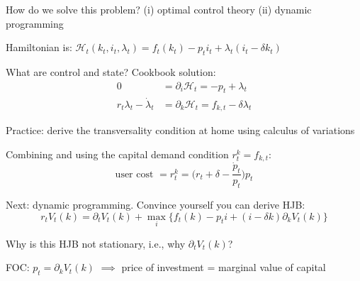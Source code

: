 \documentclass[11pt, aspectratio=169]{beamer}
\newenvironment{witemize}{\itemize\addtolength{\itemsep}{10pt}}{\enditemize}
\begin{document}
\begin{frame}{}
\begin{witemize}
\item How do we solve this problem? (i) optimal control theory (ii) dynamic programming 

\item Hamiltonian is: $\mathcal H_t (k_t, i_t, \lambda_t) = f_t(k_t) - p_t i_t + \lambda_t(i_t - \delta k_t)$ 

\item What are control and state? Cookbook solution:
	\begin{align*}
		0 &= \partial_i \mathcal H_t = - p_t + \lambda_t \\
		r_t \lambda_t - \dot \lambda_t &= \partial_k \mathcal H_t = f_{k, t} - \delta \lambda_t 
	\end{align*}

\item Practice: derive the transversality condition at home using calculus of variations

\item Combining and using the capital demand condition $r_t^k = f_{k, t}$:
\begin{equation*}
	\text{user cost } = r_t^k = \bigg( r_t + \delta - \frac{\dot p_t}{p_t} \bigg) p_t
\end{equation*}

\end{witemize}
\end{frame}


\begin{frame}{}
\begin{witemize}
\item Next: dynamic programming. Convince yourself you can derive HJB:
\begin{equation*}
	r_t V_t(k) = \partial_t V_t(k) + \max_i \bigg\{ f_t(k) - p_t i + (i - \delta k) \partial_k V_t(k) \bigg\}
\end{equation*}

\item Why is this HJB not stationary, i.e., why $\partial_t V_t(k)$?

\item FOC: $p_t = \partial_k V_t(k)$ $\implies$ price of investment = marginal value of capital

\end{witemize}
\end{frame}
\end{document}
